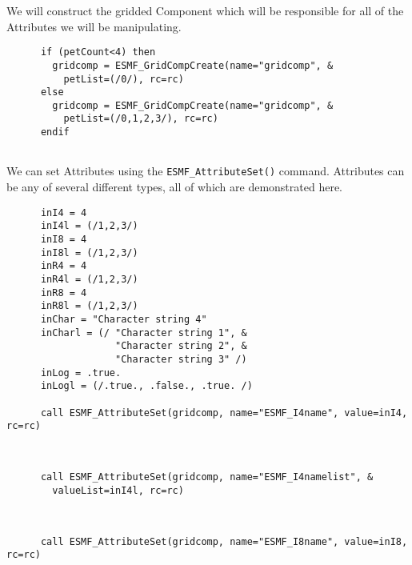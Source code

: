       We will construct the gridded Component which will be responsible for all
      of the Attributes we will be manipulating. 

 \begin{verbatim}
      if (petCount<4) then
        gridcomp = ESMF_GridCompCreate(name="gridcomp", &
          petList=(/0/), rc=rc)
      else 
        gridcomp = ESMF_GridCompCreate(name="gridcomp", &
          petList=(/0,1,2,3/), rc=rc)
      endif
 
\end{verbatim}
 

       We can set Attributes using the {\tt ESMF\_AttributeSet()} command.  
       Attributes can be any of several different types, all of which are 
       demonstrated here. 

 \begin{verbatim}
      inI4 = 4
      inI4l = (/1,2,3/)
      inI8 = 4
      inI8l = (/1,2,3/)
      inR4 = 4
      inR4l = (/1,2,3/)
      inR8 = 4
      inR8l = (/1,2,3/)
      inChar = "Character string 4"
      inCharl = (/ "Character string 1", &
                   "Character string 2", &
                   "Character string 3" /)
      inLog = .true.
      inLogl = (/.true., .false., .true. /)
      
      call ESMF_AttributeSet(gridcomp, name="ESMF_I4name", value=inI4, rc=rc)
 
\end{verbatim}
 

 \begin{verbatim}

      call ESMF_AttributeSet(gridcomp, name="ESMF_I4namelist", &
        valueList=inI4l, rc=rc)
 
\end{verbatim}
 

 \begin{verbatim}

      call ESMF_AttributeSet(gridcomp, name="ESMF_I8name", value=inI8,  rc=rc)
 
\end{verbatim}
 
